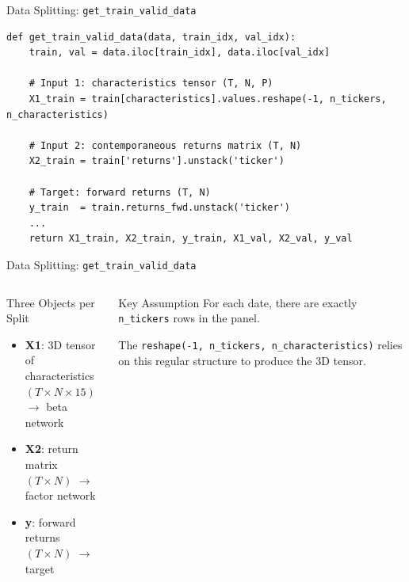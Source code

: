 \documentclass[aspectratio=169, 11pt]{beamer}
\begin{document}
%
%
\begin{frame}[fragile]{Data Splitting: \texttt{get\_train\_valid\_data}}

\begin{lstlisting}
def get_train_valid_data(data, train_idx, val_idx):
    train, val = data.iloc[train_idx], data.iloc[val_idx]

    # Input 1: characteristics tensor (T, N, P)
    X1_train = train[characteristics].values.reshape(-1, n_tickers, n_characteristics)

    # Input 2: contemporaneous returns matrix (T, N)
    X2_train = train['returns'].unstack('ticker')

    # Target: forward returns (T, N)
    y_train  = train.returns_fwd.unstack('ticker')
    ...
    return X1_train, X2_train, y_train, X1_val, X2_val, y_val
\end{lstlisting}
\end{frame}
%
%
\begin{frame}[fragile]{Data Splitting: \texttt{get\_train\_valid\_data}}

\begin{columns}[T]
\begin{block}{Three Objects per Split}
\begin{itemize}
  \item \textbf{X1}: 3D tensor of characteristics\\$(T \times N \times 15)$ $\rightarrow$ beta network
  \item \textbf{X2}: return matrix\\$(T \times N)$ $\rightarrow$ factor network
  \item \textbf{y}: forward returns\\$(T \times N)$ $\rightarrow$ target
\end{itemize}
\end{block}

\begin{block}{Key Assumption}
For each date, there are exactly \texttt{n\_tickers} rows in the panel.

\medskip

The \texttt{reshape(-1, n\_tickers, n\_characteristics)} relies on this regular structure to produce the 3D tensor.
\end{block}
\end{columns}

\end{frame}
\end{document}

